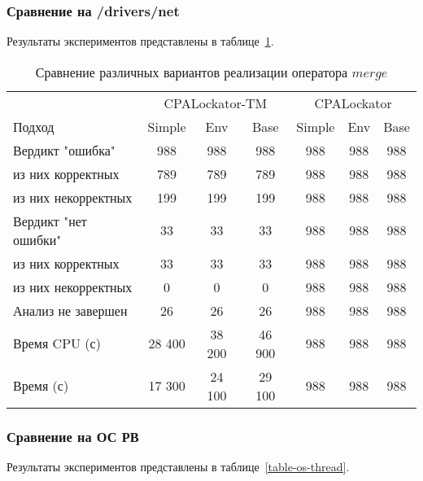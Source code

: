 \subsubsection{Сравнение на /drivers/net}
Результаты экспериментов представлены в таблице~\ref{table-drivers-thread}.

\begin{center}
  \begin{table}[h]\footnotesize
  	\label{table-drivers-thread}
    \caption{Сравнение различных вариантов реализации оператора $merge$}
    \begin{tabular}{ | l | c | c | c | c | c | c |}
      \hline
      					& \multicolumn{3}{|c|}{CPALockator-TM} 	& \multicolumn{3}{|c|}{CPALockator} 	\\
      Подход         				& Simple 	& Env 	& Base 	& Simple 	& Env 	& Base  	\\ \hline
      Вердикт "ошибка" 				& 988    	& 988   & 988   & 988       & 988   & 988  	 	\\ 
  \hspace{0.5cm} из них корректных 	& 789 		& 789 	& 789   & 988       & 988   & 988   	\\ 
  \hspace{0.5cm} из них некорректных & 199 		& 199 	& 199   & 988       & 988   & 988     	\\ \hline
      Вердикт "нет ошибки"  		& 33      	& 33    & 33    & 988       & 988  	& 988     	\\ 
  \hspace{0.5cm} из них корректных 	& 33 		& 33    & 33    & 988       & 988   & 988   	\\
  \hspace{0.5cm} из них некорректных & 0 		& 0    	& 0     & 988       & 988   & 988   	\\ \hline
      Анализ не завершен       		& 26     	& 26    & 26    & 988       & 988   & 988   	\\ \hline
      Время CPU (с)   				& 28 400 	& 38 200 & 46 900 & 988     & 988   & 988   	\\ 
      Время (с)  					& 17 300 	& 24 100 & 29 100 & 988     & 988 	& 988    	\\
      \hline
    \end{tabular}
  \end{table}
\end{center}

\subsubsection{Сравнение на ОС РВ}
Результаты экспериментов представлены в таблице~\ref{table-os-thread}.

